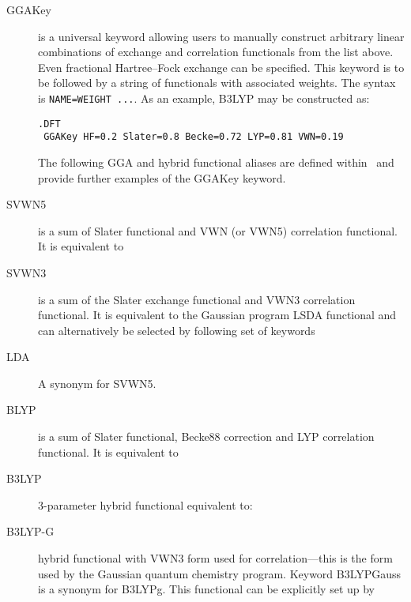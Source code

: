 \begin{description}
\begin{description}
\item[GGAKey] is a universal keyword allowing users to manually
  construct arbitrary linear combinations of exchange and correlation 
  functionals from the list above. Even fractional 
  Hartree--Fock exchange can be specified. This keyword is to be 
  followed by a string of functionals with associated weights. 
  The syntax is \verb|NAME=WEIGHT ...|. 
  As an example, B3LYP may be constructed as:
\begin{verbatim}
.DFT
 GGAKey HF=0.2 Slater=0.8 Becke=0.72 LYP=0.81 VWN=0.19
\end{verbatim}

The following GGA and hybrid functional aliases are defined within 
\lsdalton\ and provide further examples of the GGAKey keyword.

\item[SVWN5] is a sum of Slater functional and VWN (or VWN5) correlation
  functional. It is equivalent to

\item[SVWN3] is a sum of the Slater exchange functional and VWN3 correlation
  functional. It is equivalent to the Gaussian program LSDA functional 
  and can alternatively be selected by following set of keywords

\item[LDA] A synonym for SVWN5. 


\item[BLYP] is a sum of Slater functional, Becke88 correction and LYP
  correlation functional.  It is equivalent to 

\item[B3LYP] 3-parameter hybrid functional \cite{dft:b3lyp} equivalent to:

\item[B3LYP-G] hybrid functional with VWN3 form used for
  correlation---this is the form used by the Gaussian quantum chemistry
  program. Keyword B3LYPGauss is a synonym for B3LYPg. 
  This functional can be explicitly set up by


\end{description}
\end{description}

